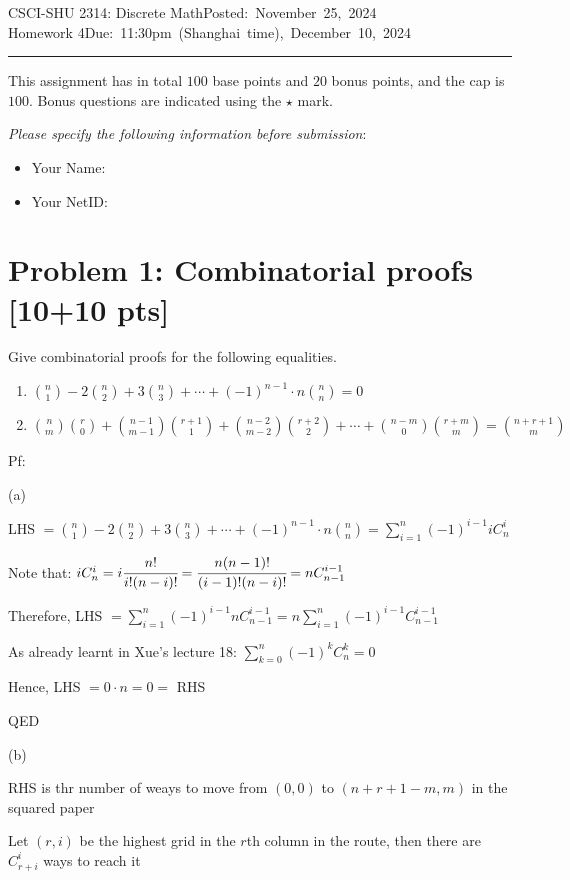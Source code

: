 \documentclass[11pt,twoside]{article}
\newcommand{\homework}[1]{
   \pagestyle{myheadings}
   \thispagestyle{plain}
   \newpage
   \setcounter{page}{1}
   \noindent
   \classname \hfill \mbox{\updatedday} \\
   \instname \hfill \mbox{\duedate}
   \rule{6.5in}{0.5mm}
   \vspace*{-0.1 in}
}
\newcommand{\problem}[1]{\section*{Problem #1}}
\def\classname{CSCI-SHU 2314: Discrete Math}
\def\updatedday{Posted: November 25, 2024}
\def\duedate{Due: 11:30pm (Shanghai time), December 10, 2024}
\def\instname{Homework 4}
\begin{document}
\homework{1}

This assignment has in total $100$ base points and $20$ bonus points, and the cap is $100$.
Bonus questions are indicated using the $\star$ mark.

\textit{Please specify the following information before submission}:
\begin{itemize}
    \item Your Name: %
    \item Your NetID: %
\end{itemize}



\problem{1: Combinatorial proofs [10+10 pts]} 

Give combinatorial proofs for the following equalities.

\begin{enumerate}

    \item $\binom{n}{1}-2\binom{n}{2}+3\binom{n}{3}+\cdots+(-1)^{n-1}\cdot n \binom{n}{n} = 0$
    \item $\binom{n}{m} \binom{r}{0} + \binom{n-1}{m-1} \binom{r+1}{1} + \binom{n-2}{m-2} \binom{r+2}{2} +\cdots+ \binom{n-m}{0} \binom{r+m}{m} = \binom{n+r+1}{m}$
    
\end{enumerate}

\hspace*{\fill}

Pf:

(a)

LHS $=\binom{n}{1}-2\binom{n}{2}+3\binom{n}{3}+\cdots+(-1)^{n-1}\cdot n \binom{n}{n} = \sum ^n_ {i=1} (-1)^{i-1}i C^i_n$

Note that: $iC^i_n = i\cfrac{n!}{i!(n-i)!} = \cfrac{n(n-1)!}{(i-1)!(n-i)!} = nC^{i-1}_{n-1}$

Therefore, LHS $= \sum ^n_ {i=1} (-1)^{i-1}nC^{i-1}_{n-1} = n\sum ^n_ {i=1} (-1)^{i-1}C^{i-1}_{n-1}$

As already learnt in Xue's lecture 18: $\sum ^n_ {k=0} (-1)^{k}C^{k}_{n} = 0$

Hence, LHS $=0\cdot n=0=$ RHS

QED

\hspace*{\fill}

(b)

RHS is thr number of weays to move from $(0,0)$ to $(n+r+1-m,m)$ in the squared paper

Let $(r,i)$ be the highest grid in the $r$th column in the route, then there are $C^i_{r+i}$ ways to reach it
\end{document}

